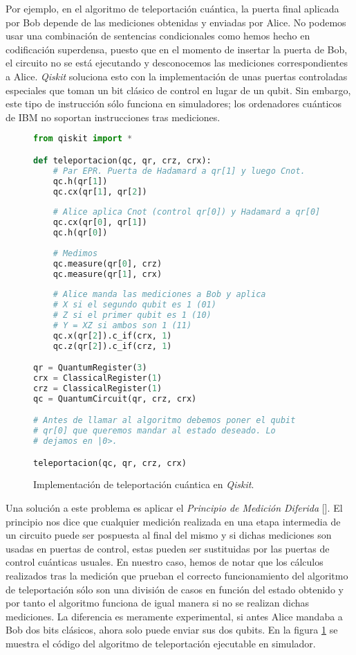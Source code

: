 Por ejemplo, en el algoritmo de teleportación cuántica, la puerta final aplicada por Bob depende de las mediciones obtenidas y enviadas por Alice. No podemos usar una combinación de sentencias condicionales como hemos hecho en codificación superdensa, puesto que en el momento de insertar la puerta de Bob, el circuito no se está ejecutando y desconocemos las mediciones correspondientes a Alice. \textit{Qiskit} soluciona esto con la implementación de unas puertas controladas especiales que toman un bit clásico de control en lugar de un qubit. Sin embargo, este tipo de instrucción sólo funciona en simuladores; los ordenadores cuánticos de IBM no soportan instrucciones tras mediciones.
\begin{figure}[tb!]
\begin{lstlisting}[language=Python]
from qiskit import *

def teleportacion(qc, qr, crz, crx):
    # Par EPR. Puerta de Hadamard a qr[1] y luego Cnot.
    qc.h(qr[1])
    qc.cx(qr[1], qr[2])
    
    # Alice aplica Cnot (control qr[0]) y Hadamard a qr[0]
    qc.cx(qr[0], qr[1])
    qc.h(qr[0])
    
    # Medimos
    qc.measure(qr[0], crz)
    qc.measure(qr[1], crx)
        
    # Alice manda las mediciones a Bob y aplica
    # X si el segundo qubit es 1 (01)
    # Z si el primer qubit es 1 (10)
    # Y = XZ si ambos son 1 (11)
    qc.x(qr[2]).c_if(crx, 1)
    qc.z(qr[2]).c_if(crz, 1)

qr = QuantumRegister(3)
crx = ClassicalRegister(1)
crz = ClassicalRegister(1)
qc = QuantumCircuit(qr, crz, crx)

# Antes de llamar al algoritmo debemos poner el qubit
# qr[0] que queremos mandar al estado deseado. Lo
# dejamos en |0>.

teleportacion(qc, qr, crz, crx)
\end{lstlisting}
\caption{Implementación de teleportación cuántica en \textit{Qiskit}.}
\label{fig:code53}
\end{figure}

Una solución a este problema es aplicar el \textit{Principio de Medición Diferida} [\cite{nielsen2001quantum}]. El principio nos dice que cualquier medición realizada en una etapa intermedia de un circuito puede ser pospuesta al final del mismo y si dichas mediciones son usadas en puertas de control, estas pueden ser sustituidas por las puertas de control cuánticas usuales. En nuestro caso, hemos de notar que los cálculos realizados tras la medición que prueban el correcto funcionamiento del algoritmo de teleportación sólo son una división de casos en función del estado obtenido y por tanto el algoritmo funciona de igual manera si no se realizan dichas mediciones. La diferencia es meramente experimental, si antes Alice mandaba a Bob dos bits clásicos, ahora solo puede enviar sus dos qubits.  En la figura \ref{fig:code53} se muestra el código del algoritmo de teleportación ejecutable en simulador.